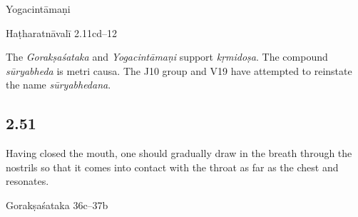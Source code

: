 \begin{ekdosis}
\begin{testimonia}[hp02_050]
Yogacintāmaṇi 
\begin{versinnote} 
\end{versinnote} 

Haṭharatnāvalī 2.11cd–12

\begin{versinnote}
\end{versinnote}
\end{testimonia}

\begin{philcomm}[hp02_050]
The \emph{Gorakṣaśataka} and \emph{Yogacintāmaṇi} support \emph{kṛmidoṣa}. The compound \emph{sūryabheda} is metri causa. The J10 group and V19 have attempted to reinstate the name \emph{sūryabhedana}.
\end{philcomm}

\subsection*{2.51}
\begin{translation}[hp02_051]
Having closed the mouth, one should gradually draw in the breath through the nostrils so that it comes into contact with the throat as far as the chest and resonates.\end{translation}

\begin{sources}[hp02_051]
Gorakṣaśataka 36c–37b

\begin{versinnote}
\end{versinnote}
\end{sources}


\end{ekdosis}
